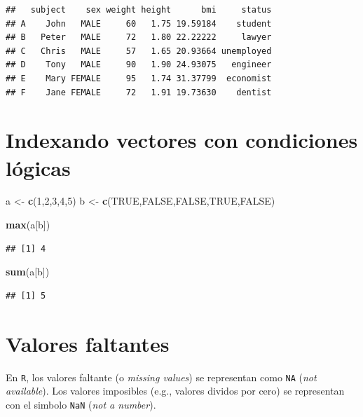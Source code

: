 \documentclass[]{book}
\newenvironment{Shaded}{\begin{snugshade}}{\end{snugshade}}
\newcommand{\KeywordTok}[1]{\textcolor[rgb]{0.13,0.29,0.53}{\textbf{#1}}}
\newcommand{\DecValTok}[1]{\textcolor[rgb]{0.00,0.00,0.81}{#1}}
\newcommand{\StringTok}[1]{\textcolor[rgb]{0.31,0.60,0.02}{#1}}
\newcommand{\OtherTok}[1]{\textcolor[rgb]{0.56,0.35,0.01}{#1}}
\newcommand{\NormalTok}[1]{#1}
\begin{document}
\begin{verbatim}
##   subject    sex weight height      bmi     status
## A    John   MALE     60   1.75 19.59184    student
## B   Peter   MALE     72   1.80 22.22222     lawyer
## C   Chris   MALE     57   1.65 20.93664 unemployed
## D    Tony   MALE     90   1.90 24.93075   engineer
## E    Mary FEMALE     95   1.74 31.37799  economist
## F    Jane FEMALE     72   1.91 19.73630    dentist
\end{verbatim}

\section{Indexando vectores con condiciones
lógicas}\label{indexando-vectores-con-condiciones-logicas}

\begin{Shaded}
\begin{Highlighting}[]
\NormalTok{a <-}\StringTok{ }\KeywordTok{c}\NormalTok{(}\DecValTok{1}\NormalTok{,}\DecValTok{2}\NormalTok{,}\DecValTok{3}\NormalTok{,}\DecValTok{4}\NormalTok{,}\DecValTok{5}\NormalTok{)}
\NormalTok{b <-}\StringTok{ }\KeywordTok{c}\NormalTok{(}\OtherTok{TRUE}\NormalTok{,}\OtherTok{FALSE}\NormalTok{,}\OtherTok{FALSE}\NormalTok{,}\OtherTok{TRUE}\NormalTok{,}\OtherTok{FALSE}\NormalTok{)}

\KeywordTok{max}\NormalTok{(a[b])}
\end{Highlighting}
\end{Shaded}

\begin{verbatim}
## [1] 4
\end{verbatim}

\begin{Shaded}
\begin{Highlighting}[]
\KeywordTok{sum}\NormalTok{(a[b])}
\end{Highlighting}
\end{Shaded}

\begin{verbatim}
## [1] 5
\end{verbatim}

\section{Valores faltantes}\label{valores-faltantes}

En \texttt{R}, los valores faltante (o \emph{missing values}) se
representan como \texttt{NA} (\emph{not available}). Los valores
imposibles (e.g., valores dividos por cero) se representan con el
simbolo \texttt{NaN} (\emph{not a number}).
\end{document}

